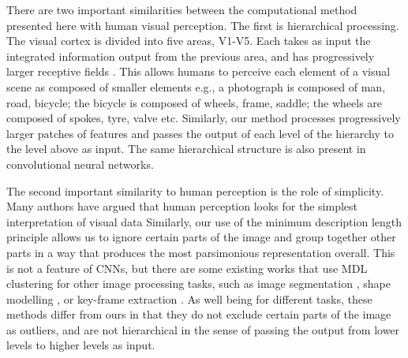 \documentclass[a4paper,fleqn]{cas-sc}
\theoremstyle{remark}
\begin{document}
There are two important similarities between the computational method presented here with human visual perception. The first is hierarchical processing. The visual cortex is divided into five areas, V1-V5. Each takes as input the integrated information output from the previous area, and has progressively larger receptive fields \citep{huff2021neuroanatomy}. This allows humans to perceive each element of a visual scene as composed of smaller elements e.g., a photograph is composed of man, road, bicycle; the bicycle is composed of wheels, frame, saddle; the wheels are composed of spokes, tyre, valve etc. Similarly, our method processes progressively larger patches of features and passes the output of each level of the hierarchy to the level above as input. The same hierarchical structure is also present in convolutional neural networks.

The second important similarity to human perception is the role of simplicity. Many authors have argued that human perception looks for the simplest interpretation of visual data \citep{chater2005minimum,feldman2016simplicity,sims2016rate}
Similarly, our use of the minimum description length principle allows us to ignore certain parts of the image and group together other parts in a way that produces the most parsimonious representation overall. This is not a feature of CNNs, but there are some existing works that use MDL clustering for other image processing tasks, such as image segmentation \citep{yang2008unsupervised}, shape modelling \citep{davies2002minimum}, or key-frame extraction \citep{gibson2002visual}. As well being for different tasks, these methods differ from ours in that they do not exclude certain parts of the image as outliers, and are not hierarchical in the sense of passing the output from lower levels to higher levels as input.
\end{document}
